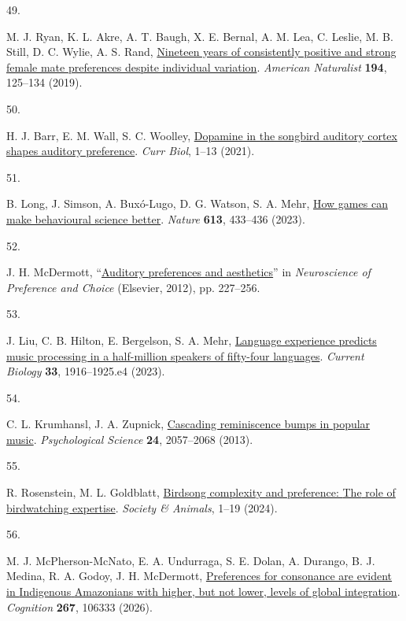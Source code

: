 \documentclass[
]{article}
\newlength{\cslhangindent}
\newlength{\csllabelwidth}
\newenvironment{CSLReferences}[2] %
 {\begin{list}{}{%
  \setlength{\itemindent}{0pt}
  \setlength{\leftmargin}{0pt}
  \setlength{\parsep}{0pt}
  \ifodd #1
   \setlength{\leftmargin}{\cslhangindent}
   \setlength{\itemindent}{-1\cslhangindent}
  \fi
  \setlength{\itemsep}{#2\baselineskip}}}
 {\end{list}}
\newcommand{\CSLLeftMargin}[1]{\parbox[t]{\csllabelwidth}{\strut#1\strut}}
\newcommand{\CSLRightInline}[1]{\parbox[t]{\linewidth - \csllabelwidth}{\strut#1\strut}}
\begin{document}
\begin{CSLReferences}{0}{0}
\CSLLeftMargin{49. }%
\CSLRightInline{M. J. Ryan, K. L. Akre, A. T. Baugh, X. E. Bernal, A. M.
Lea, C. Leslie, M. B. Still, D. C. Wylie, A. S. Rand,
\href{https://doi.org/10.1086/704103}{Nineteen years of consistently
positive and strong female mate preferences despite individual
variation}. \emph{American Naturalist} \textbf{194}, 125--134 (2019).}

\CSLLeftMargin{50. }%
\CSLRightInline{H. J. Barr, E. M. Wall, S. C. Woolley,
\href{https://doi.org/10.1016/j.cub.2021.08.005}{Dopamine in the
songbird auditory cortex shapes auditory preference}. \emph{Curr Biol},
1--13 (2021).}

\CSLLeftMargin{51. }%
\CSLRightInline{B. Long, J. Simson, A. Buxó-Lugo, D. G. Watson, S. A.
Mehr, \href{https://doi.org/10.1038/d41586-023-00065-6}{How games can
make behavioural science better}. \emph{Nature} \textbf{613}, 433--436
(2023).}

\CSLLeftMargin{52. }%
\CSLRightInline{J. H. McDermott,
{``\href{https://doi.org/10.1016/B978-0-12-381431-9.00020-6}{Auditory
preferences and aesthetics}''} in \emph{Neuroscience of {Preference} and
{Choice}} (Elsevier, 2012), pp. 227--256.}

\CSLLeftMargin{53. }%
\CSLRightInline{J. Liu, C. B. Hilton, E. Bergelson, S. A. Mehr,
\href{https://doi.org/10.1016/j.cub.2023.03.067}{Language experience
predicts music processing in a half-million speakers of fifty-four
languages}. \emph{Current Biology} \textbf{33}, 1916--1925.e4 (2023).}

\CSLLeftMargin{54. }%
\CSLRightInline{C. L. Krumhansl, J. A. Zupnick,
\href{https://doi.org/10.1177/0956797613486486}{Cascading reminiscence
bumps in popular music}. \emph{Psychological Science} \textbf{24},
2057--2068 (2013).}

\CSLLeftMargin{55. }%
\CSLRightInline{R. Rosenstein, M. L. Goldblatt,
\href{https://doi.org/10.1163/15685306-bja10206}{Birdsong complexity and
preference: {The} role of birdwatching expertise}. \emph{Society \&
Animals}, 1--19 (2024).}

\CSLLeftMargin{56. }%
\CSLRightInline{M. J. McPherson-McNato, E. A. Undurraga, S. E. Dolan, A.
Durango, B. J. Medina, R. A. Godoy, J. H. McDermott,
\href{https://doi.org/10.1016/j.cognition.2025.106333}{Preferences for
consonance are evident in {Indigenous} {Amazonians} with higher, but not
lower, levels of global integration}. \emph{Cognition} \textbf{267},
106333 (2026).}


\end{CSLReferences}
\end{document}
